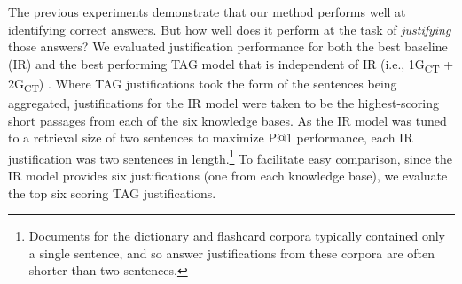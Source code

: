 {%
%
%
%

The previous experiments demonstrate that our method performs well at identifying correct answers. But how well does it perform at the task of {\em justifying} those answers?
We evaluated justification performance for both the best baseline (IR) and the best performing TAG model that is independent of IR (i.e., 1G\textsubscript{CT} + 2G\textsubscript{CT}) .  Where TAG justifications took the form of the sentences being aggregated, justifications for the IR model were taken to be the highest-scoring short passages from each of the six knowledge bases.  As the IR model was tuned to a retrieval size of two sentences to maximize P@1 performance, each IR justification was two sentences in length.\footnote{Documents for the dictionary and flashcard corpora typically contained only a single sentence, and so answer justifications from these corpora are often shorter than two sentences.} To facilitate easy comparison, since the IR model provides six justifications (one from each knowledge base), we evaluate the top six scoring TAG justifications.  

}
